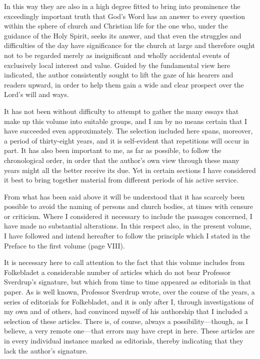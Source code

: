 
In this way they are also in a high degree fitted to bring into prominence the exceedingly important truth that God’s Word has an answer to every question within the sphere of church and Christian life for the one who, under the guidance of the Holy Spirit, seeks its answer, and that even the struggles and difficulties of the day have significance for the church at large and therefore ought not to be regarded merely as insignificant and wholly accidental events of exclusively local interest and value. Guided by the fundamental view here indicated, the author consistently sought to lift the gaze of his hearers and readers upward, in order to help them gain a wide and clear prospect over the Lord’s will and ways.

It has not been without difficulty to attempt to gather the many essays that make up this volume into suitable groups, and I am by no means certain that I have succeeded even approximately. The selection included here spans, moreover, a period of thirty-eight years, and it is self-evident that repetitions will occur in part. It has also been important to me, as far as possible, to follow the chronological order, in order that the author’s own view through these many years might all the better receive its due. Yet in certain sections I have considered it best to bring together material from different periods of his active service.

From what has been said above it will be understood that it has scarcely been possible to avoid the naming of persons and church bodies, at times with censure or criticism. Where I considered it necessary to include the passages concerned, I have made no substantial alterations. In this respect also, in the present volume, I have followed and intend hereafter to follow the principle which I stated in the Preface to the first volume (page VIII).

It is necessary here to call attention to the fact that this volume includes from Folkebladet a considerable number of articles which do not bear Professor Sverdrup’s signature, but which from time to time appeared as editorials in that paper. As is well known, Professor Sverdrup wrote, over the course of the years, a series of editorials for Folkebladet, and it is only after I, through investigations of my own and of others, had convinced myself of his authorship that I included a selection of these articles. There is, of course, always a possibility—though, as I believe, a very remote one—that errors may have crept in here. These articles are in every individual instance marked as editorials, thereby indicating that they lack the author’s signature.

